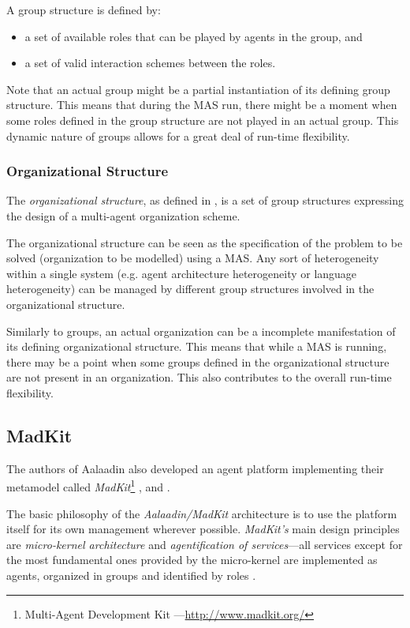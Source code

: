 A group structure is defined by:
\begin{itemize}
	\item a set of available roles that can be played by agents in the group, and
	\item a set of valid interaction schemes between the roles.
\end{itemize}

Note that an actual group might be a partial instantiation of its defining group structure.
This means that during the MAS run, there might be a moment when some roles defined in the group structure are not played in an actual group.
This dynamic nature of groups allows for a great deal of run-time flexibility.

\subsubsection*{Organizational Structure}

The \textit{organizational structure}, as defined in \cite{Ferber97}, is a set of group structures expressing the design of a multi-agent organization scheme.

The organizational structure can be seen as the specification of the problem to be solved (organization to be modelled) using a MAS.
Any sort of heterogeneity within a single system (e.g. agent architecture heterogeneity or language heterogeneity) can be managed by different group structures involved in the organizational structure.

Similarly to groups, an actual organization can be a incomplete manifestation of its defining organizational structure.
This means that while a MAS is running, there may be a point when some groups defined in the organizational structure are not present in an organization.
This also contributes to the overall run-time flexibility.

\subsection{MadKit}

The authors of Aalaadin also developed an agent platform implementing their metamodel called \textit{MadKit}\footnote{Multi-Agent Development Kit ---\url{http://www.madkit.org/}} \cite{Ferber97}, \cite{Ferber98} and \cite{Gutknecht00}.

The basic philosophy of the \textit{Aalaadin/MadKit} architecture is to use the platform itself for its own management wherever possible.
\textit{MadKit's} main design principles are \textit{micro-kernel architecture} and \textit{agentification of services}---all services except for the most fundamental ones provided by the micro-kernel are implemented as agents, organized in groups and identified by roles \cite{Ferber98}.
